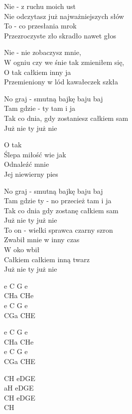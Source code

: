 \begin{text}
    Nie - z ruchu moich ust\\
    Nie odczytasz już najważniejszych słów\\
    To - co przesłania mrok\\
    Przezroczyste zło skradło nawet głos

    Nie - nie zobaczysz mnie,\\
    W ogniu czy we śnie tak zmieniłem się,\\
    O tak całkiem inny ja\\
    Przemieniony w lód kawałeczek szkła

    No graj - smutną bajkę baju baj\\
    Tam gdzie - ty tam i ja\\
    Tak co dnia, gdy zostaniesz całkiem sam\\
    Już nie ty już nie

    O tak\\
    Ślepa miłość wie jak\\
    Odnaleźć mnie\\
    Jej niewierny pies

    No graj - smutną bajkę baju baj\\
    Tam gdzie ty - no przecież tam i ja\\
    Tak co dnia gdy zostanę całkiem sam\\
    Już nie ty już nie\\
    To on - wielki sprawca czarny szron\\
    Zwabił mnie w inny czas\\
    W oko wbił\\
    Całkiem całkiem inną twarz\\
    Już nie ty już nie
\end{text}
\begin{chord}
    e C G e\\
    CHa CHe\\
    e C G e\\
    CGa CHE

    e C G e\\
    CHa CHe\\
    e C G e\\
    CGa CHE

    CH eDGE\\
    aH eDGE\\
    CH eDGE\\
    CH
\end{chord}
